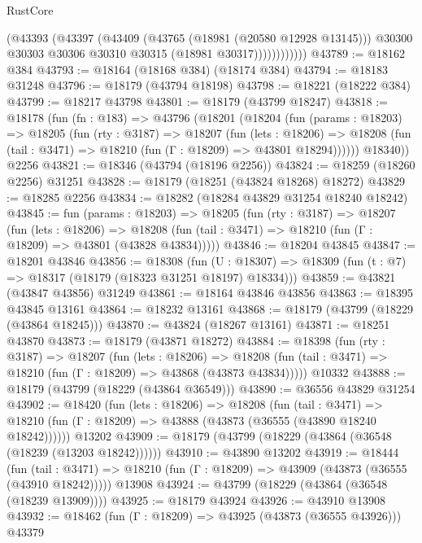 \begin{lexlean}{RustCore}
\begin{coremodule}
                    (@43393
                      (@43397
                        (@43409
                          (@43765 (@18981 (@20580 @12928 @13145)))
                          @30300
                          @30303
                          @30306
                          @30310
                          @30315
                          (@18981 @30317))))))))))))
@43789 := @18162 @384
@43793 := @18164 (@18168 @384) (@18174 @384)
@43794 := @18183 @31248
@43796 := @18179 (@43794 @18198)
@43798 := @18221 (@18222 @384)
@43799 := @18217 @43798
@43801 := @18179 (@43799 @18247)
@43818 := @18178
    (fun (fn : @183) =>
    @43796
      (@18201
        (@18204
          (fun (params : @18203) =>
          @18205
            (fun (rty : @3187) =>
            @18207
              (fun (lets : @18206) =>
              @18208 (fun (tail : @3471) => @18210 (fun (Γ : @18209) => @43801 @18294))))))
        @18340))
    @2256
@43821 := @18346 (@43794 (@18196 @2256))
@43824 := @18259 (@18260 @2256) @31251
@43828 := @18179 (@18251 (@43824 @18268) @18272)
@43829 := @18285 @2256
@43834 := @18282 (@18284 @43829 @31254 @18240 @18242)
@43845 := fun (params : @18203) =>
  @18205
    (fun (rty : @3187) =>
    @18207
      (fun (lets : @18206) =>
      @18208 (fun (tail : @3471) => @18210 (fun (Γ : @18209) => @43801 (@43828 @43834)))))
@43846 := @18204 @43845
@43847 := @18201 @43846
@43856 := @18308
    (fun (U : @18307) => @18309 (fun (t : @7) => @18317 (@18179 (@18323 @31251 @18197) @18334)))
@43859 := @43821 (@43847 @43856) @31249
@43861 := @18164 @43846 @43856
@43863 := @18395 @43845 @13161
@43864 := @18232 @13161
@43868 := @18179 (@43799 (@18229 (@43864 @18245)))
@43870 := @43824 (@18267 @13161)
@43871 := @18251 @43870
@43873 := @18179 (@43871 @18272)
@43884 := @18398
    (fun (rty : @3187) =>
    @18207
      (fun (lets : @18206) =>
      @18208 (fun (tail : @3471) => @18210 (fun (Γ : @18209) => @43868 (@43873 @43834)))))
    @10332
@43888 := @18179 (@43799 (@18229 (@43864 @36549)))
@43890 := @36556 @43829 @31254
@43902 := @18420
    (fun (lets : @18206) =>
    @18208
      (fun (tail : @3471) =>
      @18210 (fun (Γ : @18209) => @43888 (@43873 (@36555 (@43890 @18240 @18242))))))
    @13202
@43909 := @18179 (@43799 (@18229 (@43864 (@36548 (@18239 (@13203 @18242))))))
@43910 := @43890 @13202
@43919 := @18444
    (fun (tail : @3471) => @18210 (fun (Γ : @18209) => @43909 (@43873 (@36555 (@43910 @18242)))))
    @13908
@43924 := @43799 (@18229 (@43864 (@36548 (@18239 @13909))))
@43925 := @18179 @43924
@43926 := @43910 @13908
@43932 := @18462 (fun (Γ : @18209) => @43925 (@43873 (@36555 @43926))) @43379

\end{coremodule}
\end{lexlean}
